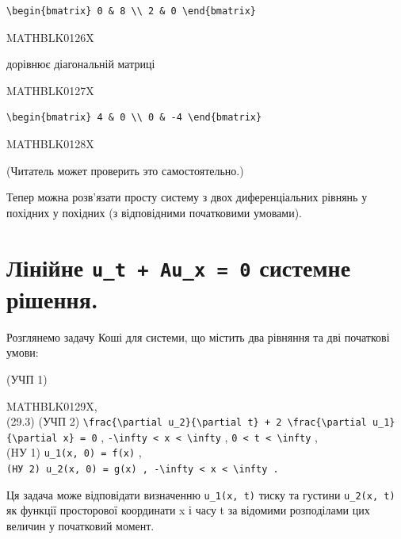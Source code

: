 \documentclass[
  ukrainian,
]{article}
\begin{document}
\begin{verbatim}
\begin{bmatrix} 0 & 8 \\ 2 & 0 \end{bmatrix}
\end{verbatim}

MATHBLK0126X

дорівнює діагональній матриці

MATHBLK0127X

\begin{verbatim}
\begin{bmatrix} 4 & 0 \\ 0 & -4 \end{bmatrix}
\end{verbatim}

MATHBLK0128X

(Читатель может проверить это самостоятельно.)

Тепер можна розв'язати просту систему з двох диференціальних рівнянь у
похідних у похідних (з відповідними початковими умовами).

\section{\texorpdfstring{Лінійне \texttt{u\_t\ +\ Au\_x\ =\ 0} системне
рішення.}{Лінійне u\_t + Au\_x = 0 системне рішення.}}\label{ux43bux456ux43dux456ux439ux43dux435-u_t-au_x-0-ux441ux438ux441ux442ux435ux43cux43dux435-ux440ux456ux448ux435ux43dux43dux44f.}

Розглянемо задачу Коші для системи, що містить два рівняння та дві
початкові умови:

(УЧП 1)

MATHBLK0129X,\\
(29.3) (УЧП 2)
\texttt{\textbackslash{}frac\{\textbackslash{}partial\ u\_2\}\{\textbackslash{}partial\ t\}\ +\ 2\ \textbackslash{}frac\{\textbackslash{}partial\ u\_1\}\{\textbackslash{}partial\ x\}\ =\ 0}
,
\texttt{-\textbackslash{}infty\ \textless{}\ x\ \textless{}\ \textbackslash{}infty}
, \texttt{0\ \textless{}\ t\ \textless{}\ \textbackslash{}infty} ,\\
(HУ 1) \texttt{u\_1(x,\ 0)\ =\ f(x)} ,\\
\texttt{(HУ\ 2)\ \textquotesingle{}u\_2(x,\ 0)\ =\ g(x)\textquotesingle{}\ ,\ \textquotesingle{}-\textbackslash{}infty\ \textless{}\ x\ \textless{}\ \textbackslash{}infty\textquotesingle{}\ .}

Ця задача може відповідати визначенню \texttt{u\_1(x,\ t)} тиску та
густини \texttt{u\_2(x,\ t)} як функції просторової координати x і часу
t за відомими розподілами цих величин у початковий момент.
\end{document}
